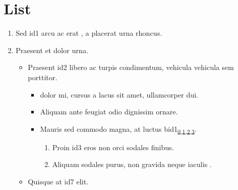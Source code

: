 \documentclass[letterpaper,10pt,english]{sphinxmanual}
\begin{document}
\section{List}
\label{\detokenize{test:list}}\begin{enumerate}
%
\item {} 
\sphinxAtStartPar
Sed \hypertarget{\detokenize{id1}}{id1} arcu ac erat \hyperlink{\detokenize{id5}}{}, a placerat urna rhoncus.

\item {} 
\sphinxAtStartPar
Praesent et dolor urna.
\begin{itemize}
\item {} 
\sphinxAtStartPar
Praesent \hypertarget{\detokenize{id2}}{id2} libero ac turpis condimentum, vehicula vehicula sem porttitor.
\begin{itemize}
\item {} 
\sphinxAtStartPar
\hyperlink{\detokenize{id6}}{} dolor mi, cursus a lacus sit amet, \hyperlink{\detokenize{id9}}{} ullamcorper dui.

\item {} 
\sphinxAtStartPar
Aliquam \hyperlink{\detokenize{id8}}{} ante feugiat odio dignissim ornare.

\item {} 
\sphinxAtStartPar
Mauris sed commodo magna, at luctus \hypertarget{\detokenize{bid1}}{bid1}\texorpdfstring{\textsubscript{\hyperlink{\detokenize{bid1-ref4}}{0},\hyperlink{\detokenize{bid1-ref20}}{1},\hyperlink{\detokenize{bid1-ref28}}{2},\hyperlink{\detokenize{bid1-ref38}}{3}}}{}.
\begin{enumerate}
%
\item {} 
\sphinxAtStartPar
Proin \hypertarget{\detokenize{id3}}{id3} eros non orci sodales finibus.

\item {} 
\sphinxAtStartPar
Aliquam \hyperlink{\detokenize{id10}}{} sodales purus, non gravida neque iaculis \hyperlink{\detokenize{bid2}}{\hypertarget{\detokenize{bid2-ref15}}{}}.

\end{enumerate}

\end{itemize}

\item {} 
\sphinxAtStartPar
Quisque at \hypertarget{\detokenize{id7}}{id7} elit.


\end{itemize}
\end{enumerate}
\end{document}
